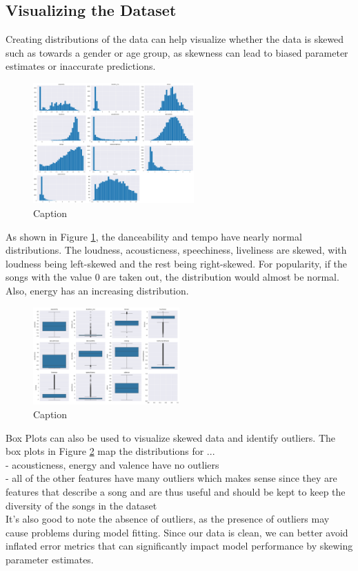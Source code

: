 \documentclass[times, twocolumn]{article}
\begin{document}
\subsection{Visualizing the Dataset}
Creating distributions of the data can help visualize whether the data is skewed such as towards a gender or age group, as skewness can lead to biased parameter estimates or inaccurate predictions.

\begin{figure}[H]
    \centering
    \includegraphics[width=0.55\textwidth]{feature_dists.png}
    \caption{Caption}
    \label{graph:dists}
\end{figure}

As shown in Figure \ref{graph:dists}, the danceability and tempo have nearly normal distributions. The loudness, acousticness, speechiness, liveliness are skewed, with loudness being left-skewed and the rest being right-skewed. For popularity, if the songs with the value 0 are taken out, the distribution would almost be normal. Also, energy has an increasing distribution.

\begin{figure}[H]
    \centering
    \includegraphics[width=0.5\textwidth]{feat_boxplots.png}
    \caption{Caption}
    \label{Boxplots}
\end{figure}

Box Plots can also be used to visualize skewed data and identify outliers.
The box plots in Figure \ref{Boxplots} map the distributions for ...\\
- acousticness, energy and valence have no outliers\\
- all of the other features have many outliers which makes sense since they are features that describe a song and are thus useful and should be kept to keep the diversity of the songs in the dataset\\
It's also good to note the absence of outliers, as the presence of outliers may cause problems during model fitting. Since our data is clean, we can better avoid inflated error metrics that can significantly impact model performance by skewing parameter estimates.
\end{document}
